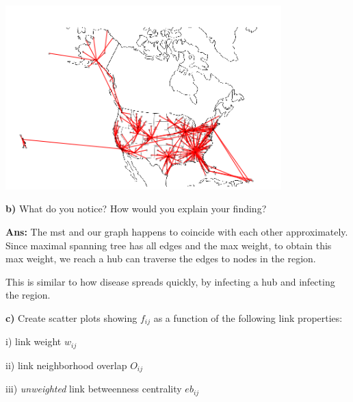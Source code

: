 \documentclass[a4paper,12pt]{article}
\begin{document}
\begin{center}
  \includegraphics[width=0.8\textwidth]{plot_mst.png}
\end{center}

\textbf{b)} What do you notice? How would you explain your finding?

\bigskip
\textbf{Ans: }The mst and our graph happens to coincide with each other approximately. Since maximal spanning tree has all edges and the max weight, to obtain this max weight, we reach a hub can traverse the edges to nodes in the region.

This is similar to how disease spreads quickly, by infecting a hub and infecting the region.

\bigskip
\textbf{c) }Create scatter plots showing $f_{ij}$ as a function of the following link properties:

i) link weight $w_{ij}$

ii) link neighborhood overlap $O_{ij}$

iii) \textit{unweighted} link betweenness centrality $eb_{ij}$
\end{document}
